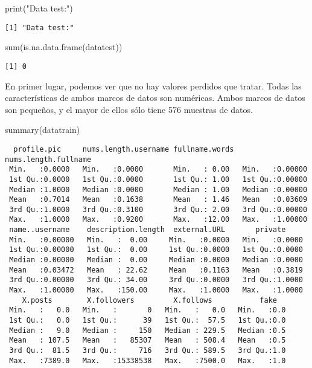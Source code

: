 \documentclass[
  letterpaper,
  DIV=11,
  numbers=noendperiod]{scrreprt}
\newenvironment{Shaded}{\begin{snugshade}}{\end{snugshade}}
\newcommand{\FunctionTok}[1]{\textcolor[rgb]{0.28,0.35,0.67}{#1}}
\newcommand{\NormalTok}[1]{\textcolor[rgb]{0.00,0.23,0.31}{#1}}
\newcommand{\StringTok}[1]{\textcolor[rgb]{0.13,0.47,0.30}{#1}}
\begin{document}
\begin{Shaded}
\begin{Highlighting}[]
\FunctionTok{print}\NormalTok{(}\StringTok{"Data test:"}\NormalTok{)}
\end{Highlighting}
\end{Shaded}

\begin{verbatim}
[1] "Data test:"
\end{verbatim}

\begin{Shaded}
\begin{Highlighting}[]
\FunctionTok{sum}\NormalTok{(}\FunctionTok{is.na.data.frame}\NormalTok{(datatest))}
\end{Highlighting}
\end{Shaded}

\begin{verbatim}
[1] 0
\end{verbatim}

En primer lugar, podemos ver que no hay valores perdidos que tratar.
Todas las características de ambos marcos de datos son numéricas. Ambos
marcos de datos son pequeños, y el mayor de ellos sólo tiene 576
muestras de datos.

\begin{Shaded}
\begin{Highlighting}[]
\FunctionTok{summary}\NormalTok{(datatrain)}
\end{Highlighting}
\end{Shaded}

\begin{verbatim}
  profile.pic     nums.length.username fullname.words  nums.length.fullname
 Min.   :0.0000   Min.   :0.0000       Min.   : 0.00   Min.   :0.00000     
 1st Qu.:0.0000   1st Qu.:0.0000       1st Qu.: 1.00   1st Qu.:0.00000     
 Median :1.0000   Median :0.0000       Median : 1.00   Median :0.00000     
 Mean   :0.7014   Mean   :0.1638       Mean   : 1.46   Mean   :0.03609     
 3rd Qu.:1.0000   3rd Qu.:0.3100       3rd Qu.: 2.00   3rd Qu.:0.00000     
 Max.   :1.0000   Max.   :0.9200       Max.   :12.00   Max.   :1.00000     
 name..username    description.length  external.URL       private      
 Min.   :0.00000   Min.   :  0.00     Min.   :0.0000   Min.   :0.0000  
 1st Qu.:0.00000   1st Qu.:  0.00     1st Qu.:0.0000   1st Qu.:0.0000  
 Median :0.00000   Median :  0.00     Median :0.0000   Median :0.0000  
 Mean   :0.03472   Mean   : 22.62     Mean   :0.1163   Mean   :0.3819  
 3rd Qu.:0.00000   3rd Qu.: 34.00     3rd Qu.:0.0000   3rd Qu.:1.0000  
 Max.   :1.00000   Max.   :150.00     Max.   :1.0000   Max.   :1.0000  
    X.posts        X.followers         X.follows           fake    
 Min.   :   0.0   Min.   :       0   Min.   :   0.0   Min.   :0.0  
 1st Qu.:   0.0   1st Qu.:      39   1st Qu.:  57.5   1st Qu.:0.0  
 Median :   9.0   Median :     150   Median : 229.5   Median :0.5  
 Mean   : 107.5   Mean   :   85307   Mean   : 508.4   Mean   :0.5  
 3rd Qu.:  81.5   3rd Qu.:     716   3rd Qu.: 589.5   3rd Qu.:1.0  
 Max.   :7389.0   Max.   :15338538   Max.   :7500.0   Max.   :1.0  
\end{verbatim}
\end{document}
